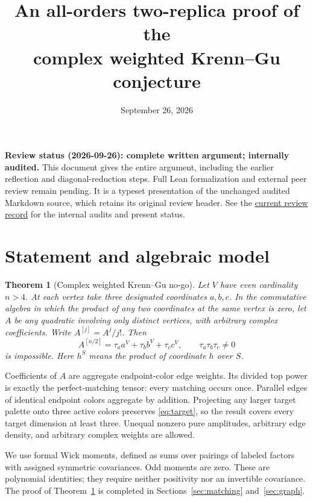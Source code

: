 \documentclass[11pt]{article}
\title{An all-orders two-replica proof of the\\complex weighted Krenn--Gu conjecture}
\author{}
\date{September 26, 2026}
\newtheorem{theorem}{Theorem}[section]
\numberwithin{equation}{section}
\begin{document}
\maketitle
\textbf{Review status (2026-09-26): complete written argument; internally audited.}
This document gives the entire argument, including the earlier reflection and
diagonal-reduction steps. Full Lean formalization and external peer review
remain pending. It is a typeset presentation of the unchanged audited Markdown
source, which retains its original review header. See the
\href{../notes/all-orders-two-replica-review-2026-09-26.md}{current review record}
for the internal audits and present status.

\section{Statement and algebraic model}\label{sec:model}

\begin{theorem}[Complex weighted Krenn--Gu no-go]\label{thm:main}
Let \(V\) have even cardinality \(n>4\). At each vertex take three designated
coordinates \(a,b,c\). In the commutative algebra in which the product of any
two coordinates at the same vertex is zero, let \(A\) be any quadratic involving
only distinct vertices, with arbitrary complex coefficients. Write
\(A^{[j]}=A^j/j!\). Then
\begin{equation}
 A^{[n/2]}=\tau_a a^V+\tau_b b^V+\tau_c c^V,
 \qquad \tau_a\tau_b\tau_c\ne0
 \tag{1}\label{eq:target}
\end{equation}
is impossible. Here \(h^S\) means the product of coordinate \(h\) over \(S\).
\end{theorem}

Coefficients of \(A\) are aggregate endpoint-color edge weights. Its divided
top power is exactly the perfect-matching tensor: every matching occurs once.
Parallel edges of identical endpoint colors aggregate by addition. Projecting
any larger target palette onto three active colors preserves \eqref{eq:target},
so the result covers every target dimension at least three. Unequal nonzero pure
amplitudes, arbitrary edge density, and arbitrary complex weights are allowed.

We use formal Wick moments, defined as sums over pairings of labeled factors
with assigned symmetric covariances. Odd moments are zero. These are polynomial
identities; they require neither positivity nor an invertible covariance.
The proof of Theorem~\ref{thm:main} is completed in Sections~\ref{sec:matching}
and~\ref{sec:graph}.
\end{document}
